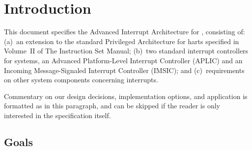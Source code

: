 
\chapter{Introduction}
\label{ch:intro}

This document specifies the Advanced Interrupt Architecture for
{\RISCV}, consisting of:
(a)~an extension to the standard Privileged Architecture for {\RISCV}
harts specified in Volume~II of The {\RISCV} Instruction Set Manual;
(b)~two standard interrupt controllers for {\RISCV} systems, an
Advanced Platform-Level Interrupt Controller (APLIC) and an
Incoming Message-Signaled Interrupt Controller (IMSIC); and
(c)~requirements on other system components concerning interrupts.

\begin{commentary}
Commentary on our design decisions, implementation options, and
application is formatted as in this paragraph, and can be skipped if
the reader is only interested in the specification itself.
\end{commentary}

\section{Goals}

